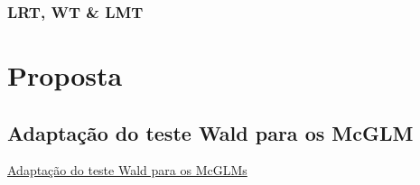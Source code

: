 \documentclass[10pt,
  aspectratio=169,
  serif,
  mathserif,
  professionalfont,
  compress,
  handout,
  ]{beamer}\usepackage[]{graphicx}\usepackage[]{color}
\begin{document}
\begin{frame}
  \frametitle{LRT, WT \& LMT}

\begin{figure} %
\end{figure} %

\end{frame}


\section{Proposta}


\subsection{Adaptação do teste Wald para os McGLM}


\begin{frame}[c, allowframebreaks]

\begin{center}

  {\normalsize \href{https://lineu96.github.io/st/}{Adaptação do teste Wald para os McGLMs}}
  
\end{center}

\end{frame}
\end{document}
